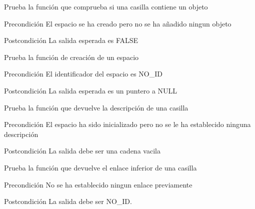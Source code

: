 \begin{DoxyRefList}
\item[\label{test__test000313}%
\hypertarget{test__test000313}{}%
Global \hyperlink{space__test_8c_a40c719627cda8b937649826d7f0f02f9}{test3\-\_\-space\-\_\-contains\-\_\-object} ()]Prueba la función que comprueba si una casilla contiene un objeto \begin{DoxyPrecond}{Precondición}
El espacio se ha creado pero no se ha añadido ningun objeto 
\end{DoxyPrecond}
\begin{DoxyPostcond}{Postcondición}
La salida esperada es F\-A\-L\-S\-E  
\end{DoxyPostcond}

\item[\label{test__test000241}%
\hypertarget{test__test000241}{}%
Global \hyperlink{space__test_8c_aa4d892ebae9ea65c173b627eab34681b}{test3\-\_\-space\-\_\-create} ()]Prueba la función de creación de un espacio \begin{DoxyPrecond}{Precondición}
El identificador del espacio es N\-O\-\_\-\-I\-D 
\end{DoxyPrecond}
\begin{DoxyPostcond}{Postcondición}
La salida esperada es un puntero a N\-U\-L\-L  
\end{DoxyPostcond}

\item[\label{test__test000278}%
\hypertarget{test__test000278}{}%
Global \hyperlink{space__test_8c_aca42558a0206cbc5b6cf5f4af7d618bb}{test3\-\_\-space\-\_\-get\-\_\-description} ()]Prueba la función que devuelve la descripción de una casilla \begin{DoxyPrecond}{Precondición}
El espacio ha sido inicializado pero no se le ha establecido ninguna descripción 
\end{DoxyPrecond}
\begin{DoxyPostcond}{Postcondición}
La salida debe ser una cadena vacila  
\end{DoxyPostcond}

\item[\label{test__test000303}%
\hypertarget{test__test000303}{}%
Global \hyperlink{space__test_8c_aa1fe442a18905d7006ccf8efcbcff8f5}{test3\-\_\-space\-\_\-get\-\_\-down} ()]Prueba la función que devuelve el enlace inferior de una casilla \begin{DoxyPrecond}{Precondición}
No se ha establecido ningun enlace previamente 
\end{DoxyPrecond}
\begin{DoxyPostcond}{Postcondición}
La salida debe ser N\-O\-\_\-\-I\-D.  
\end{DoxyPostcond}


\end{DoxyRefList}
